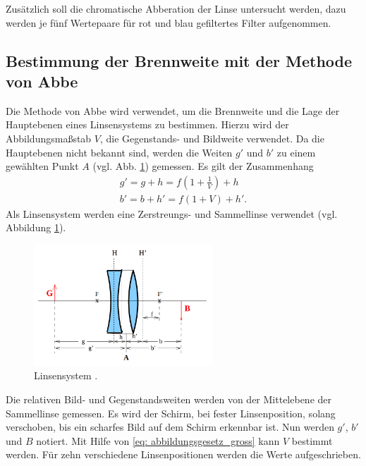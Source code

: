 Zusätzlich soll die chromatische Abberation der Linse untersucht werden,
dazu werden je fünf Wertepaare für rot und blau gefiltertes Filter
aufgenommen.
\subsection{Bestimmung der Brennweite mit der Methode von Abbe}
Die Methode von Abbe wird verwendet, um die Brennweite und die Lage der Hauptebenen
eines Linsensystems zu bestimmen. Hierzu wird der Abbildungsmaßstab $V$,
die Gegenstands- und Bildweite verwendet. Da die Hauptebenen nicht bekannt sind,
werden die Weiten $g'$ und $b'$ zu einem gewählten Punkt $A$ (vgl. Abb. \ref{fig: linsensystem}) gemessen.
Es gilt der Zusammenhang
\begin{align}
    g'=g+h=f\left(1+\frac{1}{V}\right)+h \label{eq: abstaende_abbe_g} \\
    b'=b+h'=f\left(1+V\right)+h' \label{eq: abstaende_abbe_b}.
\end{align}
Als Linsensystem werden eine Zerstreungs- und Sammellinse verwendet (vgl. Abbildung \ref{fig: linsensystem}). %
\begin{figure}
    \centering
    \includegraphics[width=0.6\textwidth]{./pics/linsensystem.png}
    \caption{Linsensystem \cite{anleitung408}.}
    \label{fig: linsensystem}
\end{figure}
Die relativen Bild- und Gegenstandsweiten werden von der Mittelebene
der Sammellinse gemessen.
Es wird der Schirm, bei fester Linsenposition, solang verschoben, bis ein scharfes
Bild auf dem Schirm erkennbar ist. Nun werden $g'$, $b'$ und $B$ notiert.
Mit Hilfe von \eqref{eq: abbildungsgesetz_gross} 
kann $V$ bestimmt werden.
Für zehn verschiedene Linsenpositionen werden die Werte aufgeschrieben. %

